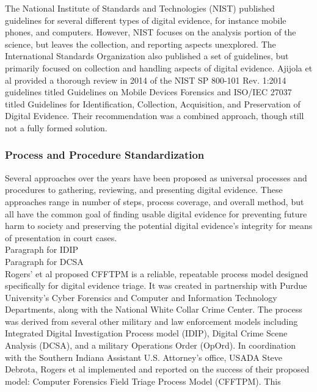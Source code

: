 \documentclass[12pt]{article}
\begin{document}
The National Institute of Standards and Technologies (NIST) published guidelines for several
different types of digital evidence, for instance mobile phones, and computers.
However, NIST focuses on the analysis portion of the science, but leaves the collection,
and reporting aspects unexplored.  The International Standards Organization also published
a set of guidelines, but primarily focused on collection and handling aspects of digital
evidence.  
Ajijola et al\cite{ajijola2014review} provided a thorough review in 2014 of the NIST SP
800-101 Rev. 1:2014 guidelines
titled Guidelines on Mobile Devices Forensics and ISO/IEC 27037 titled
Guidelines for
Identification, Collection, Acquisition, and Preservation of Digital Evidence.
Their recommendation was a combined approach, though still not a fully formed solution.\\

\subsubsection{Process and Procedure Standardization}

Several approaches over the years have been proposed as universal processes and procedures to
gathering, reviewing, and presenting digital evidence.  These approaches range in number of
steps, process coverage, and overall method, 
but all have the common goal of finding usable digital evidence for preventing future
harm to society and preserving the potential digital evidence's 
integrity for means of presentation in court cases.\\

Paragraph for IDIP\\

Paragraph for DCSA\\

Rogers' et al\cite{rogers2006computer} proposed CFFTPM is a reliable, repeatable process 
model designed specifically for digital evidence triage.  It was created in partnership
with Purdue University's Cyber Forensics and Computer and Information
Technology Departments, along with the National White Collar Crime
Center\cite{rogers2006computer}.
The process was derived from several other military and law enforcement models
including Integrated Digital Investigation Process model (IDIP), 
Digital Crime Scene Analysis (DCSA),
and a military Operations Order (OpOrd).  In coordination with the Southern Indiana 
Assistant U.S. Attorney's office,
USADA Steve Debrota, Rogers et al\cite{rogers2006computer} implemented and reported
on the success of their proposed
model: Computer Forensics Field Triage Process Model (CFFTPM).  This \\
\end{document}

